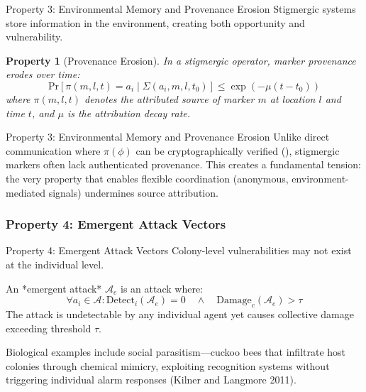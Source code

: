 \documentclass[
  ignorenonframetext,
]{beamer}
\providecommand{\cref}[1]{\texttt{\detokenize{#1}}}
\newtheorem{property}{Property}
\begin{document}
\begin{frame}[allowframebreaks]{Property 3: Environmental Memory and
Provenance Erosion}
Stigmergic systems store information in the environment, creating both
opportunity and vulnerability.

\begin{property}[Provenance Erosion]
\label{prop:provenance-erosion}
In a stigmergic operator, marker provenance erodes over time:
\begin{equation}
\label{eq:provenance-erosion}
\text{Pr}\left[\pi(m, l, t) = a_i \mid \Sigma(a_i, m, l, t_0)\right] \leq \exp(-\mu(t - t_0))
\end{equation}
where $\pi(m, l, t)$ denotes the attributed source of marker $m$ at location $l$ and time $t$, and $\mu$ is the attribution decay rate.
\end{property}

\end{frame}

\begin{frame}[allowframebreaks]{Property 3: Environmental Memory and
Provenance Erosion}
Unlike direct communication where \(\pi(\phi)\) can be cryptographically
verified (\cref{sec:provenance}), stigmergic markers often lack
authenticated provenance. This creates a fundamental tension: the very
property that enables flexible coordination (anonymous,
environment-mediated signals) undermines source attribution.
\end{frame}

\subsubsection{Property 4: Emergent Attack
Vectors}\label{sec:emergent-attacks}

\begin{frame}[allowframebreaks]{Property 4: Emergent Attack Vectors}
Colony-level vulnerabilities may not exist at the individual level.

\begin{definition}
\label{def:emergent-attack}
An *emergent attack* $\mathcal{A}_e$ is an attack where:
\begin{equation}
\label{eq:emergent-attack}
\forall a_i \in \mathcal{A}: \text{Detect}_i(\mathcal{A}_e) = 0 \quad \land \quad \text{Damage}_c(\mathcal{A}_e) > \tau
\end{equation}
The attack is undetectable by any individual agent yet causes collective damage exceeding threshold $\tau$.
\end{definition}

Biological examples include social parasitism---cuckoo bees that
infiltrate host colonies through chemical mimicry, exploiting
recognition systems without triggering individual alarm responses
(Kilner and Langmore 2011).
\end{frame}
\end{document}
